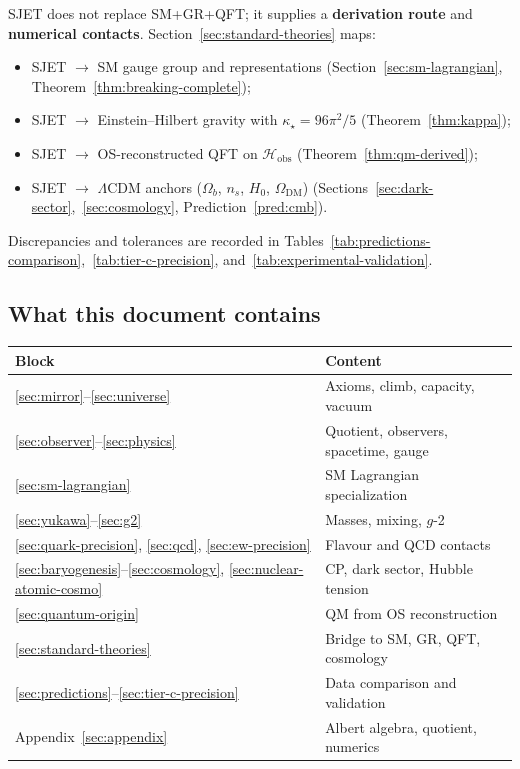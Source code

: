 SJET does not replace SM+GR+QFT; it supplies a \textbf{derivation route} and
\textbf{numerical contacts}. Section~\ref{sec:standard-theories} maps:
\begin{itemize}[leftmargin=*]
  \item SJET $\to$ SM gauge group and representations
    (Section~\ref{sec:sm-lagrangian}, Theorem~\ref{thm:breaking-complete});
  \item SJET $\to$ Einstein--Hilbert gravity with $\kappa_\star=96\pi^2/5$
    (Theorem~\ref{thm:kappa});
  \item SJET $\to$ OS-reconstructed QFT on $\mathcal{H}_{\mathrm{obs}}$
    (Theorem~\ref{thm:qm-derived});
  \item SJET $\to$ $\Lambda$CDM anchors ($\Omega_b$, $n_s$, $H_0$, $\Omega_{\mathrm{DM}}$)
    (Sections~\ref{sec:dark-sector},~\ref{sec:cosmology},
    Prediction~\ref{pred:cmb}).
\end{itemize}
Discrepancies and tolerances are recorded in
Tables~\ref{tab:predictions-comparison},~\ref{tab:tier-c-precision},
and~\ref{tab:experimental-validation}.

\subsection{What this document contains}

\begin{center}
\small
\renewcommand{\arraystretch}{1.12}
\begin{tabular}{@{}ll@{}}
\toprule
\textbf{Block} & \textbf{Content} \\
\midrule
\ref{sec:mirror}--\ref{sec:universe} &
  Axioms, climb, capacity, vacuum \\
\ref{sec:observer}--\ref{sec:physics} &
  Quotient, observers, spacetime, gauge \\
\ref{sec:sm-lagrangian} &
  SM Lagrangian specialization \\
\ref{sec:yukawa}--\ref{sec:g2} &
  Masses, mixing, $g$-2 \\
\ref{sec:quark-precision}, \ref{sec:qcd}, \ref{sec:ew-precision} &
  Flavour and QCD contacts \\
\ref{sec:baryogenesis}--\ref{sec:cosmology}, \ref{sec:nuclear-atomic-cosmo} &
  CP, dark sector, Hubble tension \\
\ref{sec:quantum-origin} &
  QM from OS reconstruction \\
\ref{sec:standard-theories} &
  Bridge to SM, GR, QFT, cosmology \\
\ref{sec:predictions}--\ref{sec:tier-c-precision} &
  Data comparison and validation \\
Appendix~\ref{sec:appendix} &
  Albert algebra, quotient, numerics \\
\bottomrule
\end{tabular}
\end{center}

